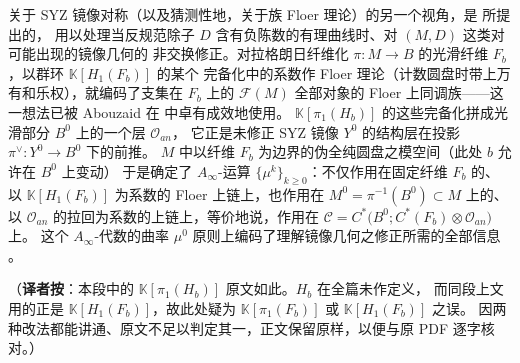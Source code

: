 \documentclass[UTF8,a4paper,11pt,fontset=windows]{ctexart}
\theoremstyle{cnthm}
\numberwithin{equation}{section}
\newcommand{\KK}{\mathbb{K}}          %
\newcommand{\FF}{\mathcal{F}}         %
\newcommand{\OH}{\mathcal{O}}         %
\begin{document}

关于 SYZ 镜像对称（以及猜测性地，关于族 Floer 理论）的另一个视角，是 \cite{r24} 所提出的，
用以处理当反规范除子 $D$ 含有负陈数的有理曲线时、对 $(M,D)$ 这类对可能出现的镜像几何的
非交换修正。对拉格朗日纤维化 $\pi:M\to B$ 的光滑纤维 $F_b$，以群环 $\KK[H_1(F_b)]$ 的某个
完备化中的系数作 Floer 理论（计数圆盘时带上万有和乐权），就编码了支集在 $F_b$ 上的
$\FF(M)$ 全部对象的 Floer 上同调族——这一想法已被 Abouzaid 在 \cite{r5} 中卓有成效地使用。
$\KK[\pi_1(H_b)]$ 的这些完备化拼成光滑部分 $B^{0}$ 上的一个层 $\OH_{an}$，
它正是未修正 SYZ 镜像 $Y^{0}$ 的结构层在投影 $\pi^{\vee}:Y^{0}\to B^{0}$ 下的前推。
$M$ 中以纤维 $F_b$ 为边界的伪全纯圆盘之模空间（此处 $b$ 允许在 $B^{0}$ 上变动）
于是确定了 $A_\infty$-运算 $\{\mu^{k}\}_{k\ge0}$：不仅作用在固定纤维 $F_b$ 的、以
$\KK[H_1(F_b)]$ 为系数的 Floer 上链上，也作用在 $M^{0}=\pi^{-1}(B^{0})\subset M$ 上的、
以 $\OH_{an}$ 的拉回为系数的上链上，等价地说，作用在
$\mathcal{C}=C^{*}\bigl(B^{0};C^{*}(F_b)\otimes\OH_{an}\bigr)$ 上。
这个 $A_\infty$-代数的曲率 $\mu^{0}$ 原则上编码了理解镜像几何之修正所需的全部信息 \cite{r24}。

\smallskip
\noindent（\textbf{译者按}：本段中的 $\KK[\pi_1(H_b)]$ 原文如此。$H_b$ 在全篇未作定义，
而同段上文用的正是 $\KK[H_1(F_b)]$，故此处疑为 $\KK[\pi_1(F_b)]$ 或 $\KK[H_1(F_b)]$ 之误。
因两种改法都能讲通、原文不足以判定其一，正文保留原样，以便与原 PDF 逐字核对。）

\smallskip

\end{document}
